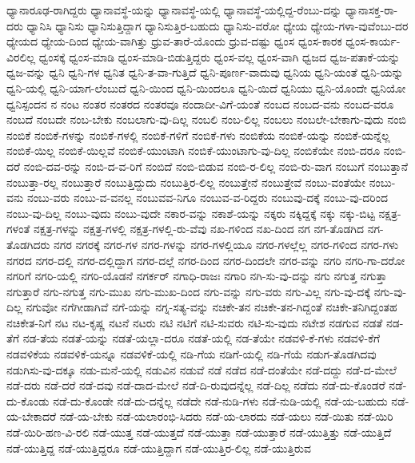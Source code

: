 {ಧ್ಯಾನಾರೂಢ-ರಾಗಿದ್ದರು
ಧ್ಯಾನಾವಸ್ಥೆ-ಯನ್ನು
ಧ್ಯಾನಾವಸ್ಥೆ-ಯಲ್ಲಿ
ಧ್ಯಾನಾವಸ್ಥೆ-ಯಲ್ಲಿದ್ದ-ರೆಂಬು-ದನ್ನು
ಧ್ಯಾನಾಸಕ್ತ-ರಾ-ದರು
ಧ್ಯಾನಿಸಿ
ಧ್ಯಾನಿಸು
ಧ್ಯಾನಿಸುತ್ತಿದ್ದಾಗ
ಧ್ಯಾನಿಸುತ್ತಿರ-ಬಹುದು
ಧ್ಯಾನಿಸು-ವರೋ
ಧ್ಯೇಯ
ಧ್ಯೇಯ-ಗಳಾ-ವುವೆಂಬು-ದರ
ಧ್ಯೇಯದ
ಧ್ಯೇಯ-ದಿಂದ
ಧ್ಯೇಯ-ವಾಗಿತ್ತು
ಧ್ರುವ-ತಾರೆ-ಯೊಂದು
ಧ್ರುವ-ದಷ್ಟು
ಧ್ವಂಸ
ಧ್ವಂಸ-ಕಾರಕ
ಧ್ವಂಸ-ಕಾರ್ಯ-ವಿರಲಿಲ್ಲ
ಧ್ವಂಸಕ್ಕೆ
ಧ್ವಂಸ-ಮಾಡಿ
ಧ್ವಂಸ-ಮಾಡಿ-ಬಿಡುತ್ತಿದ್ದರು
ಧ್ವಂಸ-ವಲ್ಲ
ಧ್ವಂಸ-ವಾಗಿ
ಧ್ವಜದ
ಧ್ವಜ-ಪತಾಕೆ-ಯನ್ನು
ಧ್ವಜ-ವನ್ನು
ಧ್ವನಿ
ಧ್ವನಿ-ಗಳ
ಧ್ವನಿತ
ಧ್ವನಿ-ತ-ವಾ-ಗುತ್ತಿದೆ
ಧ್ವನಿ-ಪೂರ್ಣ-ವಾದುವು
ಧ್ವನಿಯ
ಧ್ವನಿ-ಯಂತೆ
ಧ್ವನಿ-ಯನ್ನು
ಧ್ವನಿ-ಯಲ್ಲಿ
ಧ್ವನಿ-ಯಾಗ-ಲೆಂಬುದೆ
ಧ್ವನಿ-ಯಿಂದ
ಧ್ವನಿ-ಯಿಂದಲೂ
ಧ್ವನಿ-ಯಿದೆ
ಧ್ವನಿಯು
ಧ್ವನಿ-ಯೊಂದೇ
ಧ್ವನಿಯೋ
ಧ್ವನಿಸ್ಪಂದನ
ನ
ನಂಟ
ನಂತರ
ನಂತರದ
ನಂತರವೂ
ನಂದಾದೀ-ವಿಗೆ-ಯಂತೆ
ನಂಬದ
ನಂಬದ-ವನು
ನಂಬದ-ವರೂ
ನಂಬದೆ
ನಂಬದೇ
ನಂಬ-ಬೇಕು
ನಂಬಲಾಗು-ವು-ದಿಲ್ಲ
ನಂಬಲಿ
ನಂಬ-ಲಿಲ್ಲ
ನಂಬಲು
ನಂಬಲೇ-ಬೇಕಾಗು-ವುದು
ನಂಬಿ
ನಂಬಿಕೆ
ನಂಬಿಕೆ-ಗಳನ್ನು
ನಂಬಿಕೆ-ಗಳಲ್ಲಿ
ನಂಬಿಕೆ-ಗಳಿಗೆ
ನಂಬಿಕೆ-ಗಳು
ನಂಬಿಕೆಯ
ನಂಬಿಕೆ-ಯನ್ನು
ನಂಬಿಕೆ-ಯನ್ನೆಲ್ಲ
ನಂಬಿಕೆ-ಯಿಲ್ಲ
ನಂಬಿಕೆ-ಯಿಲ್ಲವೆ
ನಂಬಿಕೆ-ಯುಂಟಾಗಿ
ನಂಬಿಕೆ-ಯುಂಟಾಗು-ವು-ದಿಲ್ಲ
ನಂಬಿಕೆಯೇ
ನಂಬಿ-ದರೂ
ನಂಬಿ-ದರೆ
ನಂಬಿ-ದವ-ರನ್ನು
ನಂಬಿ-ದ-ವ-ರಿಗೆ
ನಂಬಿದೆ
ನಂಬಿ-ಬಿಡುವ
ನಂಬಿ-ರ-ಲಿಲ್ಲ
ನಂಬಿ-ರು-ವಾಗ
ನಂಬುಗೆ
ನಂಬುತ್ತಾನೆ
ನಂಬುತ್ತಾ-ರಲ್ಲ
ನಂಬುತ್ತಾರೆ
ನಂಬುತ್ತಿದ್ದುದು
ನಂಬುತ್ತಿರ-ಲಿಲ್ಲ
ನಂಬುತ್ತೇನೆ
ನಂಬುತ್ತೇವೆ
ನಂಬು-ವಂತೆಯೇ
ನಂಬು-ವನು
ನಂಬು-ವರು
ನಂಬು-ವ-ವನಲ್ಲ
ನಂಬುವವ-ನಿಗೂ
ನಂಬುವ-ವ-ರಿದ್ದರು
ನಂಬುವು-ದಕ್ಕೆ
ನಂಬು-ವು-ದರಿಂದ
ನಂಬು-ವು-ದಿಲ್ಲ
ನಂಬು-ವುದು
ನಂಬು-ವುದೇ
ನಕಾರ-ವನ್ನು
ನಕಾಶೆ-ಯನ್ನು
ನಕ್ಕರು
ನಕ್ಕಿದ್ದಕ್ಕೆ
ನಕ್ಕು
ನಕ್ಕು-ಬಿಟ್ಟ
ನಕ್ಷತ್ರ-ಗಳಂತೆ
ನಕ್ಷತ್ರ-ಗಳನ್ನು
ನಕ್ಷತ್ರ-ಗಳಲ್ಲಿ
ನಕ್ಷತ್ರ-ಗಳಲ್ಲಿ-ರು-ವೆವು
ನಖ-ಗಳಿಂದ
ನಖ-ದಿಂದ
ನಗ
ನಗ-ತೊಡಗಿದ
ನಗ-ತೊಡಗಿದರು
ನಗರ
ನಗರಕ್ಕೆ
ನಗರ-ಗಳ
ನಗರ-ಗಳನ್ನು
ನಗರ-ಗಳಲ್ಲಿಯೂ
ನಗರ-ಗಳಲ್ಲೆಲ್ಲ
ನಗರ-ಗಳಿಂದ
ನಗರ-ಗಳು
ನಗರದ
ನಗರ-ದಲ್ಲಿ
ನಗರ-ದಲ್ಲಿದ್ದಾಗ
ನಗರ-ದಲ್ಲೆ
ನಗರ-ದಿಂದ
ನಗರ-ದಿಂದಲೇ
ನಗರ-ವನ್ನು
ನಗರಿ
ನಗರಿ-ಗಾ-ದರೋ
ನಗರಿಗೆ
ನಗರಿ-ಯಲ್ಲಿ
ನಗರಿ-ಯೊಡನೆ
ನಗರ್ಕರ್
ನಗಾಧಿ-ರಾಜಃ
ನಗಾರಿ
ನಗಿ-ಸು-ವು-ದನ್ನು
ನಗು
ನಗುತ್ತ
ನಗುತ್ತಾ
ನಗುತ್ತಾರೆ
ನಗು-ನಗುತ್ತ
ನಗು-ಮುಖ
ನಗು-ಮುಖ-ದಿಂದ
ನಗು-ವನ್ನು
ನಗು-ವರು
ನಗು-ವಿಲ್ಲ
ನಗು-ವು-ದಕ್ಕೆ
ನಗು-ವು-ದಿಲ್ಲ
ನಗುವೋ
ನಗೆಗೀಡಾಗಿವೆ
ನಗೆ-ಯನ್ನು
ನಗ್ನ-ಸತ್ಯ-ವನ್ನು
ನಚಿಕೇ-ತನ
ನಚಿಕೇ-ತನ-ಗಿದ್ದಂತೆ
ನಚಿಕೇ-ತನಿಗಿದ್ದಂತಹ
ನಚಿಕೇತ-ನಿಗೆ
ನಟ
ನಟ-ಕೃಷ್ಣ
ನಟನೆ
ನಟರು
ನಟಿ
ನಟಿಗೆ
ನಟಿ-ಸುವರು
ನಟಿ-ಸು-ವುದು
ನಟೇಶ
ನಡಗುವ
ನಡತೆ
ನಡ-ತೆಗೆ
ನಡ-ತೆಯ
ನಡತೆ-ಯನ್ನು
ನಡತೆ-ಯಲ್ಲಾ-ದರೂ
ನಡತೆ-ಯಲ್ಲಿ
ನಡ-ತೆಯೇ
ನಡವಳಿ-ಕೆ-ಗಳು
ನಡವಳಿ-ಕೆಗೆ
ನಡವಳಿಕೆಯ
ನಡವಳಿಕೆ-ಯನ್ನೂ
ನಡವಳಿಕೆ-ಯಲ್ಲಿ
ನಡಿ-ಗೆಯ
ನಡಿಗೆ-ಯಲ್ಲಿ
ನಡಿ-ಗೆಯೆ
ನಡುಗ-ತೊಡಗಿದವು
ನಡುಗಿಸು-ವು-ದಕ್ಕೂ
ನಡು-ಮನೆ-ಯಲ್ಲಿ
ನಡುವಿನ
ನಡುವೆ
ನಡೆ
ನಡೆದ
ನಡೆ-ದಂತೆಯೇ
ನಡೆ-ದದ್ದು
ನಡೆ-ದ-ಮೇಲೆ
ನಡೆ-ದರು
ನಡೆ-ದರೆ
ನಡೆ-ದವು
ನಡೆ-ದಾದ-ಮೇಲೆ
ನಡೆ-ದಿ-ರುವುದನ್ನೆಲ್ಲ
ನಡೆ-ದಿಲ್ಲ
ನಡೆದು
ನಡೆ-ದು-ಕೊಂಡರೆ
ನಡೆ-ದು-ಕೊಂಡು
ನಡೆ-ದು-ಕೊಂಡೇ
ನಡೆ-ದು-ದನ್ನೆಲ್ಲ
ನಡೆದೇ
ನಡೆ-ನುಡಿ-ಗಳು
ನಡೆ-ನುಡಿ-ಯಲ್ಲಿ
ನಡೆ-ಯ-ಬಹುದು
ನಡೆ-ಯ-ಬೇಕಾದರೆ
ನಡೆ-ಯ-ಬೇಕು
ನಡೆ-ಯಲಾರಂಭಿ-ಸಿದರು
ನಡೆ-ಯ-ಲಾರದು
ನಡೆ-ಯಲು
ನಡೆ-ಯಿತು
ನಡೆ-ಯಿರಿ
ನಡೆ-ಯಿರಿ-ಹಣ-ವಿ-ರಲಿ
ನಡೆ-ಯುತ್ತ
ನಡೆ-ಯುತ್ತದೆ
ನಡೆ-ಯುತ್ತಾ
ನಡೆ-ಯುತ್ತಾರೆ
ನಡೆ-ಯುತ್ತಿತ್ತು
ನಡೆ-ಯುತ್ತಿದೆ
ನಡೆ-ಯುತ್ತಿದ್ದ
ನಡೆ-ಯುತ್ತಿದ್ದರೂ
ನಡೆ-ಯುತ್ತಿದ್ದಾಗ
ನಡೆ-ಯುತ್ತಿರ-ಲಿಲ್ಲ
ನಡೆ-ಯುತ್ತಿರುವ
}
